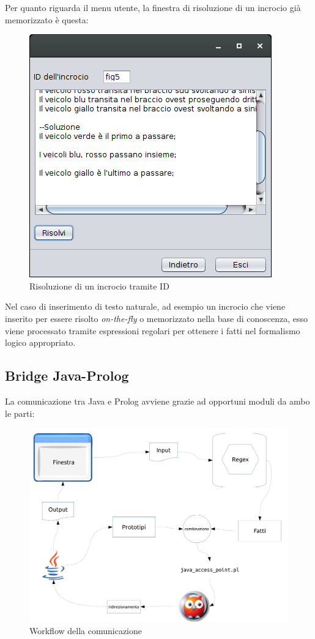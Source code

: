 Per quanto riguarda il menu utente, la finestra di risoluzione di un incrocio già memorizzato è questa:
\begin{figure}[!htb]
	\centering
	\includegraphics[width=.5\textwidth]{images/solve_gui}
	\caption{Risoluzione di un incrocio tramite ID}
\end{figure}

Nel caso di inserimento di testo naturale, ad esempio un incrocio che viene inserito per essere risolto \textit{on-the-fly} o memorizzato nella base di conoscenza, esso viene processato tramite espressioni regolari per ottenere i fatti nel formalismo logico appropriato.

\clearpage

\subsection{Bridge Java-Prolog}

La comunicazione tra Java e Prolog avviene grazie ad opportuni moduli da ambo le parti:

\begin{figure}[!htb]
	\centering
	\includegraphics[width=\textwidth]{images/jap}
	\caption{Workflow della comunicazione}
\end{figure}

